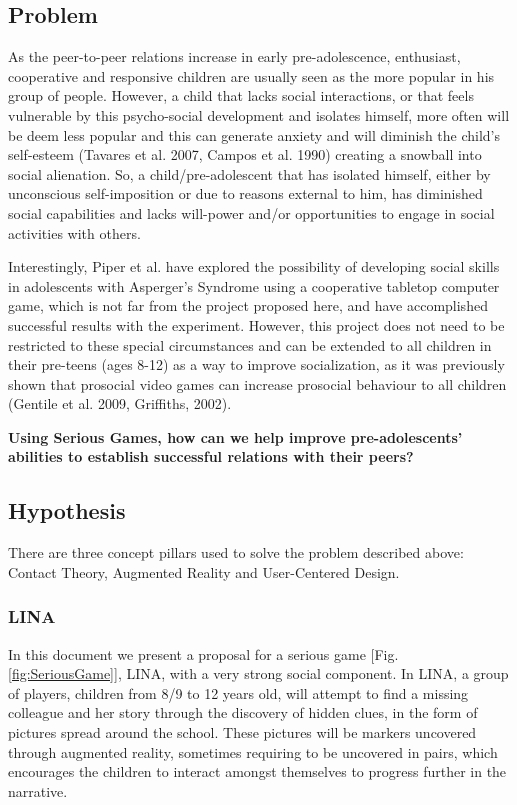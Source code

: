 \documentclass[runningheads]{llncs}
\begin{document}
\subsection{Problem}

\par As the peer-to-peer relations increase in early pre-adolescence, enthusiast, cooperative and responsive children are usually seen as the more popular in his group of people. However, a child that lacks social interactions, or that feels vulnerable by this psycho-social development and isolates himself, more often will be deem less popular and this can generate anxiety and will diminish the child's self-esteem (Tavares et al. 2007, Campos et al. 1990) creating a snowball into social alienation. So, a child/pre-adolescent that has isolated himself, either by unconscious self-imposition or due to reasons external to him, has diminished social capabilities and lacks will-power and/or opportunities to engage in social activities with others. 
 
\par Interestingly, Piper et al. have explored the possibility of developing social skills in adolescents with Asperger's Syndrome using a cooperative tabletop computer game, which is not far from the project proposed here, and have accomplished successful results with the experiment. However, this project does not need to be restricted to these special circumstances and can be extended to all children in their pre-teens (ages 8-12) as a way to improve socialization, as it was previously shown that prosocial video games can increase prosocial behaviour to all children (Gentile et al. 2009, Griffiths, 2002).
\par \textbf{Using Serious Games, how can we help improve pre-adolescents' abilities to establish successful relations with their peers?}




\subsection{Hypothesis}

\par There are three concept pillars used to solve the problem described above: Contact Theory, Augmented Reality and User-Centered Design.

\subsubsection{LINA}
\par In this document we present a proposal for a serious game [Fig. \ref{fig:SeriousGame}], LINA, with a very strong social component. In LINA, a group of players, children from 8/9 to 12 years old, will attempt to find a missing colleague and her story through the discovery of hidden clues, in the form of pictures spread around the school. These pictures will be markers uncovered through augmented reality, sometimes requiring to be uncovered in pairs, which encourages the children to interact amongst themselves to progress further in the narrative.
\end{document}
